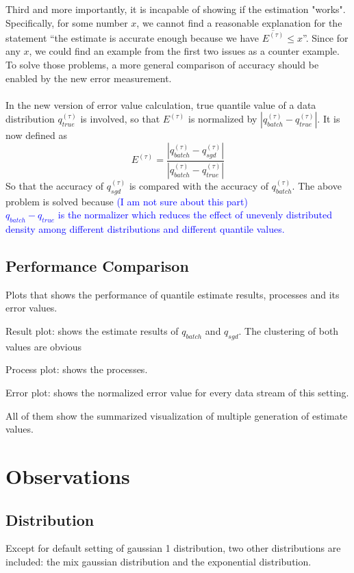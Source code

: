 \documentclass[12pt]{article}
\begin{document}
 Third and more importantly, it is incapable of showing if the estimation "works". Specifically, for some number $x$, we cannot find a reasonable explanation for the statement ``the estimate is accurate enough because we have $\overline{E^{(\tau)}} \leq x$''. Since for any $x$, we could find an example from the first two issues as a counter example. To solve those problems, a more general comparison of accuracy should be enabled by the new error measurement.
\\\\
In the new version of error value calculation, true quantile value of a data distribution $q_{true}^{(\tau)}$ is involved, so that $E^{(\tau)}$ is normalized by $|q_{batch}^{(\tau)} - q_{true}^{(\tau)}|$. It is now defined as
$$
    E^{(\tau)} = \frac{|q_{batch}^{(\tau)} - q_{sgd}^{(\tau)}|}
                      {|q_{batch}^{(\tau)} - q_{true}^{(\tau)}|}
$$
So that the accuracy of $q_{sgd}^{(\tau)}$ is compared with the accuracy of $q_{batch}^{(\tau)}$. The above problem is solved because 
\textcolor{blue}{(I am not sure about this part)\\
    $
    q_{batch} - q_{true}
    $
    is the normalizer which reduces the effect of unevenly distributed density among different distributions and different quantile values.
}

\subsection{Performance Comparison}
Plots that shows the performance of quantile estimate results, processes and its error values.

Result plot: shows the estimate results of $q_{batch}$ and $q_{sgd}$. The clustering of both values are obvious

Process plot: shows the processes.

Error plot: shows the normalized error value for every data stream of this setting.

All of them show the summarized visualization of multiple generation of estimate values.


\pagebreak
\section{Observations}

\subsection{Distribution}
Except for default setting of gaussian 1 distribution, two other distributions are included: the mix gaussian distribution and the exponential distribution.
\end{document}
